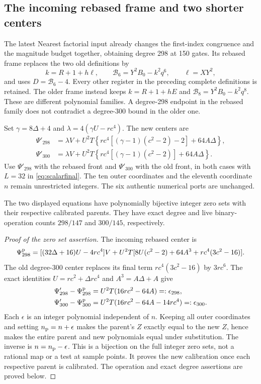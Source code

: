 \subsection{The incoming rebased frame and two shorter centers}
The latest Nearest factorial input already changes the first-index
congruence and the magnitude budget together, obtaining degree 298 at
150 gates. Its rebased frame replaces the two old definitions by
\begin{equation}\label{eq:rebased-frame}
 k=R+1+h\ell,\qquad \mathcal B_6=Y^2B_0-k^2q^6,
 \qquad \ell=XY^2,
\end{equation}
and uses $D=\mathcal B_6-4$. Every other register in the preceding
complete definitions is retained. The older frame instead keeps
$k=R+1+hE$ and $\mathcal B_8=Y^2B_0-k^2q^8$.
These are different polynomial families. A degree-298 endpoint in the
rebased family does not contradict a degree-300 bound in the older one.

Set $\gamma=8\Delta+4$ and
$\lambda=4(\gamma U-rc^4)$. The new centers are
\begin{align}
 \Psi'_{298}&=\lambda V+U^2T
  \left\{rc^4[(\gamma-1)(c^2-2)-2]+64A\Delta\right\},
       \label{eq:center298}\\
 \Psi'_{300}&=\lambda V+U^2T
  \left\{rc^4[(\gamma-1)(c^2-2)]+64A\Delta\right\}.
       \label{eq:center300}
\end{align}
Use $\Psi'_{298}$ with the rebased front and $\Psi'_{300}$ with the
old front, in both cases with $L=32$ in \eqref{eq:scalarfinal}.
The ten outer coordinates and the eleventh coordinate $n$ remain
unrestricted integers. The six authentic numerical ports are unchanged.

\begin{theorem}\label{thm:center-shear}
The two displayed equations have polynomially bijective integer zero sets
with their respective calibrated parents. They have exact degree and live
binary-operation counts $298/147$ and $300/145$, respectively.
\end{theorem}
\begin{proof}[Proof of the zero set assertion]
The incoming rebased center is
\[
 \Psi^{\rm p}_{298}=[(32\Delta+16)U-4rc^4]V
 +U^2T[8U(c^2-2)+64A^3+rc^4(3c^2-16)].
\]
The old degree-300 center replaces its final term $rc^4(3c^2-16)$
by $3rc^6$. The exact identities
$U=rc^2+\Delta rc^4$ and $A^3=A\Delta+A$ give
\begin{align*}
 \Psi'_{298}-\Psi^{\rm p}_{298}
      &=U^2T(16rc^2-64A)=:\epsilon_{298},\\
 \Psi'_{300}-\Psi^{\rm p}_{300}
      &=U^2T(16rc^2-64A-14rc^4)=:\epsilon_{300}.
\end{align*}
Each $\epsilon$ is an integer polynomial independent of $n$.
Keeping all outer coordinates and setting $n_{\rm p}=n+\epsilon$
makes the parent's $Z$ exactly equal to the new $Z$, hence makes the
entire parent and new polynomials equal under substitution.
The inverse is $n=n_{\rm p}-\epsilon$. This is a bijection on the
full integer zero sets, not a rational map or a test at sample points.
It proves the new calibration once each respective parent is calibrated.
The operation and exact degree assertions are proved below.
\end{proof}


